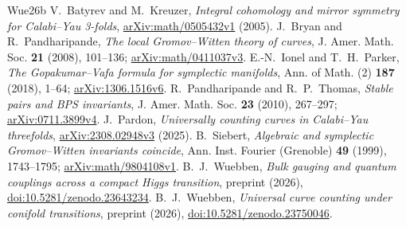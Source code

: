 \begin{thebibliography}{Wue26b}
 V.~Batyrev and M.~Kreuzer,
\emph{Integral cohomology and mirror symmetry for Calabi--Yau 3-folds},
\href{https://arxiv.org/abs/math/0505432v1}{arXiv:math/0505432v1} (2005).
 J.~Bryan and R.~Pandharipande,
\emph{The local Gromov--Witten theory of curves},
J. Amer. Math. Soc. \textbf{21} (2008), 101--136;
\href{https://arxiv.org/abs/math/0411037v3}{arXiv:math/0411037v3}.
 E.-N.~Ionel and T.~H.~Parker,
\emph{The Gopakumar--Vafa formula for symplectic manifolds},
Ann. of Math. (2) \textbf{187} (2018), 1--64;
\href{https://arxiv.org/abs/1306.1516v6}{arXiv:1306.1516v6}.
 R.~Pandharipande and R.~P.~Thomas,
\emph{Stable pairs and BPS invariants},
J. Amer. Math. Soc. \textbf{23} (2010), 267--297;
\href{https://arxiv.org/abs/0711.3899v4}{arXiv:0711.3899v4}.
 J.~Pardon,
\emph{Universally counting curves in Calabi--Yau threefolds},
\href{https://arxiv.org/abs/2308.02948v3}{arXiv:2308.02948v3} (2025).
 B.~Siebert,
\emph{Algebraic and symplectic Gromov--Witten invariants coincide},
Ann. Inst. Fourier (Grenoble) \textbf{49} (1999), 1743--1795;
\href{https://arxiv.org/abs/math/9804108v1}{arXiv:math/9804108v1}.
 B.~J.~Wuebben,
\emph{Bulk gauging and quantum couplings across a compact Higgs transition},
preprint (2026),
\href{https://doi.org/10.5281/zenodo.23643234}{doi:10.5281/\allowbreak zenodo.23643234}.
 B.~J.~Wuebben,
\emph{Universal curve counting under conifold transitions},
preprint (2026),
\href{https://doi.org/10.5281/zenodo.23750046}{doi:10.5281/\allowbreak zenodo.23750046}.
\end{thebibliography}
